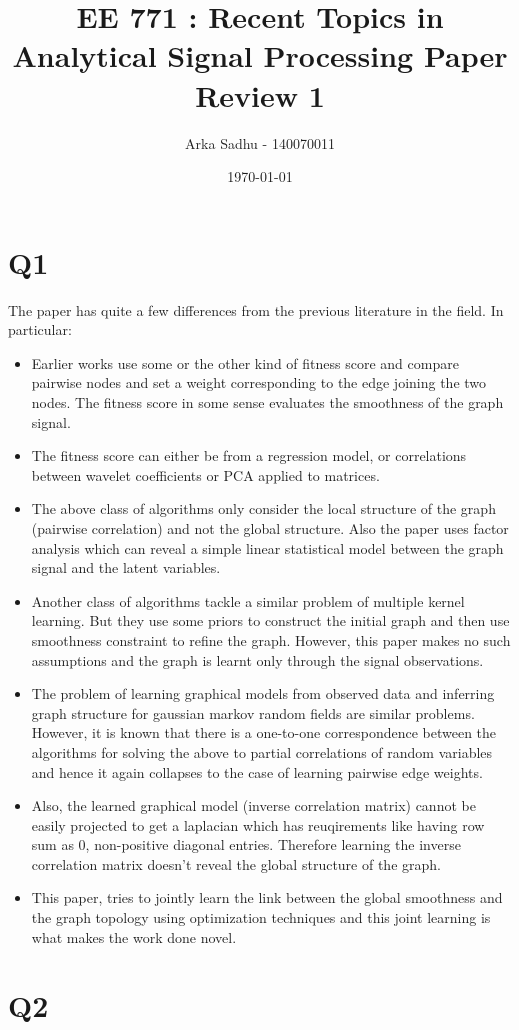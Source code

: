 \documentclass{article}
\title{EE 771 : Recent Topics in Analytical Signal Processing Paper Review 1}
\author{Arka Sadhu - 140070011}
\date{\today}
\begin{document}
\maketitle

\section*{Q1}
The paper has quite a few differences from the previous literature in the field. In particular:
\begin{itemize}
\item Earlier works use some or the other kind of fitness score and compare pairwise nodes and set a weight corresponding to the edge joining the two nodes. The fitness score in some sense evaluates the smoothness of the graph signal.
\item The fitness score can either be from a regression model, or correlations between wavelet coefficients or PCA applied to matrices.
\item The above class of algorithms only consider the local structure of the graph (pairwise correlation) and not the global structure. Also the paper uses factor analysis which can reveal a simple linear statistical model between the graph signal and the latent variables.
\item Another class of algorithms tackle a similar problem of multiple kernel learning. But they use some priors to construct the initial graph and then use smoothness constraint to refine the graph. However, this paper makes no such assumptions and the graph is learnt only through the signal observations.
\item The problem of learning graphical models from observed data and inferring graph structure for gaussian markov random fields are similar problems. However, it is known that there is a one-to-one correspondence between the algorithms for solving the above to partial correlations of random variables and hence it again collapses to the case of learning pairwise edge weights.
\item Also, the learned graphical model (inverse correlation matrix) cannot be easily projected to get a laplacian which has reuqirements like having row sum as 0, non-positive diagonal entries. Therefore learning the inverse correlation matrix doesn't reveal the global structure of the graph.
\item This paper, tries to jointly learn the link between the global smoothness and the graph topology using optimization techniques and this joint learning is what makes the work done novel.
\end{itemize}

\section*{Q2}
\end{document}
